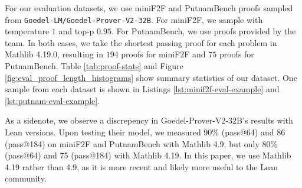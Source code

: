 For our evaluation datasets, we use miniF2F and PutnamBench proofs sampled from \texttt{Goedel-LM/Goedel-Prover-V2-32B}. For miniF2F, we sample with temperature $1$ and top-p $0.95$. For PutnamBench, we use proofs provided by the team. In both cases, we take the shortest passing proof for each problem in Mathlib 4.19.0, resulting in $194$ proofs for miniF2F and $75$ proofs for PutnamBench. Table \ref{tab:proof-stats} and Figure \ref{fig:eval_proof_length_histograms} show summary statistics of our dataset. One sample from each dataset is shown in Listings \ref{lst:minif2f-eval-example} and \ref{lst:putnam-eval-example}.

As a sidenote, we observe a discrepency in Goedel-Prover-V2-32B's results with Lean versions. Upon testing their model, we measured 90\% (pass@64) and 86 (pass@184) on miniF2F and PutnamBench with Mathlib 4.9, but only 80\% (pass@64) and 75 (pass@184) with Mathlib 4.19. In this paper, we use Mathlib 4.19 rather than 4.9, as it is more recent and likely more useful to the Lean community.


